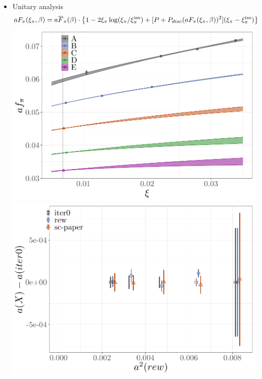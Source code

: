 \documentclass[xcolor={dvipsnames,table}]{beamer}
\begin{document}
\begin{frame}
  \begin{itemize}
    \item Unitary analysis
          \begin{align*}
            aF_{\pi}(\xi_{\pi}, \beta) & =  a\overline{F}_{\pi}(\beta) \cdot \left\{1-2\xi_{\pi}\log(\xi_{\pi}/\xi_{\pi}^{\rm iso})+ [P+P_{disc} (aF_\pi(\xi_{\pi},\beta))^2] (\xi_{\pi}-\xi^{\rm iso}_{\pi})\right\}
          \end{align*}
          \includegraphics[scale=0.5]{plots/fpi_rew}
          \includegraphics[scale=0.5]{plots/scaling_a}
  \end{itemize}
\end{frame}
\end{document}
